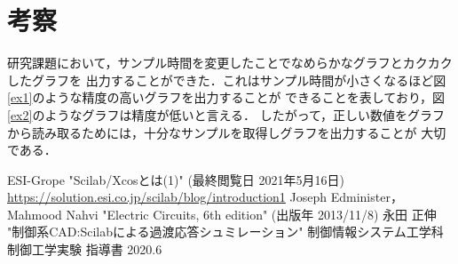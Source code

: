 \documentclass[a4paper,11pt]{jsarticle}
\begin{document}
  \section{考察}
    研究課題において，サンプル時間を変更したことでなめらかなグラフとカクカクしたグラフを
    出力することができた．これはサンプル時間が小さくなるほど図\ref{ex1}のような精度の高いグラフを出力することが
    できることを表しており，図\ref{ex2}のようなグラフは精度が低いと言える．
    したがって，正しい数値をグラフから読み取るためには，十分なサンプルを取得しグラフを出力することが
    大切である．

\begin{thebibliography}{3}
   ESI-Grope "Scilab/Xcosとは(1)" (最終閲覧日 2021年5月16日)\\\url{https://solution.esi.co.jp/scilab/blog/introduction1}
   Joseph Edminister，Mahmood Nahvi "Electric Circuits, 6th edition" (出版年 2013/11/8)
   永田 正伸 "制御系CAD:Scilabによる過渡応答シュミレーション" 制御情報システム工学科 制御工学実験 指導書 2020.6
\end{thebibliography}
\end{document}
